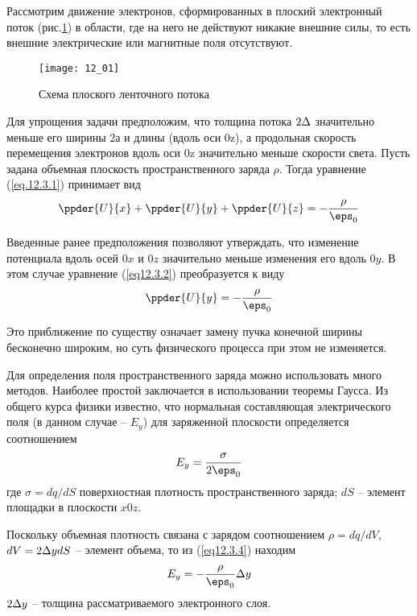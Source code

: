 
Рассмотрим движение электронов, сформированных в плоский электронный поток 
(рис.\ref{img12.1}) в области, где на него не действуют никакие внешние силы, 
то есть внешние электрические или магнитные поля отсутствуют.

\begin{figure}[h!]
	\center
	\texttt{[image: 12\_01]}
	\caption{Схема плоского ленточного потока}
	\label{img12.1}
\end{figure}

Для упрощения задачи предположим, что толщина потока \( 2\Delta \) значительно 
меньше его ширины \( 2а \) и длины (вдоль оси 0z), а продольная скорость 
перемещения электронов вдоль оси 0z значительно меньше скорости света. Пусть 
задана объемная плоскость пространственного заряда \( \rho \). Тогда уравнение 
(\ref{eq.12.3.1}) принимает вид
\begin{equation}
	\ppder{U}{x} + \ppder{U}{y} + \ppder{U}{z} = -\frac{\rho}{\eps_0}
	\label{eq12.3.2}
\end{equation}

Введенные ранее предположения позволяют утверждать, что изменение потенциала 
вдоль осей \( 0x \) и \( 0z \) значительно меньше изменения его вдоль 
\( 0y \). В этом случае уравнение (\ref{eq12.3.2}) преобразуется к виду
\begin{equation}
	\ppder{U}{y} = -\frac{\rho}{\eps_0}
	\label{eq12.3.3}
\end{equation}
 
Это приближение по существу означает замену пучка конечной ширины бесконечно 
широким, но суть физического процесса при этом не изменяется.

Для определения поля пространственного заряда можно использовать много 
методов. Наиболее простой заключается в использовании теоремы Гаусса. Из 
общего курса физики известно, что нормальная составляющая электрического поля 
(в данном случае -- \( E_y \)) для заряженной плоскости определяется
соотношением
\begin{equation}
	E_y = \frac{\sigma}{2\eps_0}
	\label{eq12.3.4}
\end{equation}
где \( \sigma = dq/dS \) поверхностная плотность пространственного заряда;
\( dS \) -- элемент площадки в плоскости \( x0z \).

Поскольку объемная плотность связана с зарядом соотношением 
\( \rho = dq/dV \), \( dV = 2\Delta ydS \) -- элемент объема, то из 
(\ref{eq12.3.4}) находим
\begin{equation}
	E_y = -\frac{\rho}{\eps_0}\D y
	\label{eq12.3.5}
\end{equation}
\( 2\Delta y \) -- толщина рассматриваемого электронного слоя.

